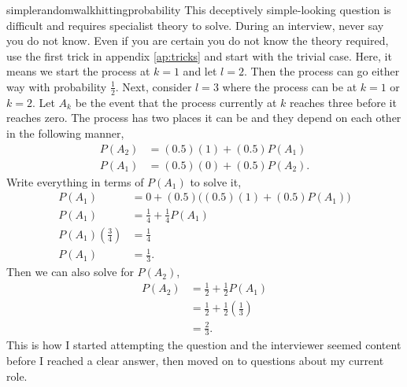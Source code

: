 \begin{answer}{simplerandomwalkhittingprobability}
This deceptively simple-looking question is difficult and requires specialist theory to solve.
During an interview, never say you do not know.
Even if you are certain you do not know the theory required, use the first trick in appendix \ref{ap:tricks} and start with the trivial case.
Here, it means we start the process at $k=1$ and let $l=2$.
Then the process can go either way with probability $\frac{1}{2}$.
Next, consider $l=3$ where the process can be at $k=1$ or $k=2$.
Let $A_k$ be the event that the process currently at $k$ reaches three before it reaches zero.
The process has two places it can be and they depend on each other in the following manner,
\begin{align*}
P(A_2) &= (0.5)(1) + (0.5)P(A_1)  \\
P(A_1) &= (0.5)(0) + (0.5)P(A_2)
\text{.}
\end{align*}
Write everything in terms of $P(A_1)$ to solve it,
\begin{align*}
P(A_1) &= 0 + (0.5) \Big((0.5)(1) + (0.5) P(A_1)\Big) \\
P(A_1) &= \frac{1}{4} + \frac{1}{4}P(A_1) \\
P(A_1) \left(\frac{3}{4}\right)&= \frac{1}{4} \\
P(A_1) &= \frac{1}{3}
\text{.}
\end{align*}
Then we can also solve for $P(A_2)$,
\begin{align*}
P(A_2) &= \frac{1}{2} + \frac{1}{2} P(A_1)  \\
       &= \frac{1}{2} + \frac{1}{2}\left(\frac{1}{3}\right) \\
       &= \frac{2}{3}
\text{.}
\end{align*}
This is how I started attempting the question and the interviewer seemed content before I reached a clear answer, then moved on to questions about my current role.


\end{answer}
